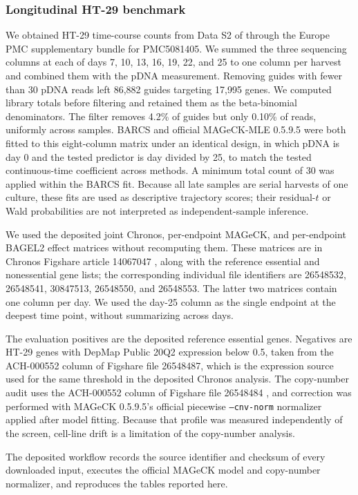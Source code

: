 \subsubsection{Longitudinal HT-29 benchmark}

We obtained HT-29 time-course counts from Data S2 of
\citet{tzelepis2016dropout} through the Europe PMC supplementary bundle for
PMC5081405.  We summed the three sequencing columns at each of days 7, 10, 13,
16, 19, 22, and 25 to one column per harvest and combined them with the pDNA
measurement. Removing guides with fewer than 30 pDNA reads left 86,882 guides
targeting 17,995 genes.  We computed library totals before filtering and
retained them as the beta-binomial denominators.  The filter removes 4.2\% of
guides but only 0.10\% of reads, uniformly across samples. BARCS and official
MAGeCK-MLE 0.5.9.5 were both fitted to this eight-column matrix under an
identical design, in which pDNA is day 0 and the tested predictor is day
divided by 25, to match the tested continuous-time coefficient across methods.
A minimum total count of 30 was applied within the BARCS fit. Because all late
samples are serial harvests of one culture, these fits are used as descriptive
trajectory scores; their residual-$t$ or Wald probabilities are not
interpreted as independent-sample inference.

We used the deposited joint Chronos, per-endpoint MAGeCK, and per-endpoint
BAGEL2 effect matrices without recomputing them.  These matrices are in
Chronos Figshare article 14067047 \citep{chronosfigshare2021}, along with the
reference essential and nonessential gene lists; the corresponding individual
file identifiers are 26548532, 26548541, 30847513, 26548550, and 26548553. The
latter two matrices contain one column per day.  We used the day-25 column as
the single endpoint at the deepest time point, without summarizing across
days.

The evaluation positives are the deposited reference essential genes.
Negatives are HT-29 genes with DepMap Public 20Q2 expression below 0.5, taken
from the ACH-000552 column of Figshare file 26548487, which is the expression
source used for the same threshold in the deposited Chronos analysis.  The
copy-number audit uses the ACH-000552 column of Figshare file 26548484
\citep{depmap20q2}, and correction was performed with MAGeCK 0.5.9.5's
official piecewise \texttt{--cnv-norm} normalizer applied after model fitting.
Because that profile was measured independently of the screen, cell-line drift
is a limitation of the copy-number analysis.

The deposited workflow records the source identifier and checksum of every
downloaded input, executes the official MAGeCK model and copy-number
normalizer, and reproduces the tables reported here.
